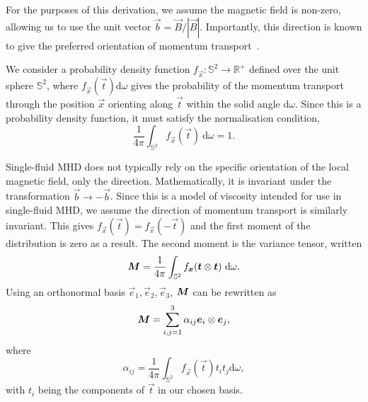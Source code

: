 For the purposes of this derivation, we assume the magnetic field is non-zero, allowing us to use the unit vector $\vec{b} = \vec{B}/|\vec{B}|$. Importantly, this direction is known to give the preferred orientation of momentum transport~\cite{braginskiiTransportProcessesPlasma1965}.

We consider a probability density function $f_{\vec{x}} : \mathbb{S}^2 \to \mathbb{R}^+$ defined over the unit sphere $\mathbb{S}^2$, where $f_\vec{x}(\vec{t}) \text{d}\omega$ gives the probability of the momentum transport through the position $\vec{x}$ orienting along $\vec{t}$ within the solid angle d$\omega$. Since this is a probability density function, it must satisfy the normalisation condition,
\begin{equation}
  \label{eq:normalisation_condition}
  \frac{1}{4\pi} \int_{\mathbb{S}^2} f_\vec{x}(\vec{t})\ \text{d}\omega = 1.
\end{equation}

Single-fluid MHD does not typically rely on the specific orientation of the local magnetic field, only the direction. Mathematically, it is invariant under the transformation $\vec{b} \to -\vec{b}$. Since this is a model of viscosity intended for use in single-fluid MHD, we assume the direction of momentum transport is similarly invariant. This gives $f_\vec{x}(\vec{t}) = f_\vec{x}(-\vec{t})$ and the first moment of the distribution is zero as a result. The second moment is the variance tensor, written
\begin{equation}
  \label{eq:variance_tensor}
{\bm M} = \frac{1}{4\pi} \int_{\mathbb{S}^2} f_{\bm x}({\bm t} \otimes {\bm t}) \ \text{d}\omega.
\end{equation}
Using an orthonormal basis ${\vec{e}_1, \vec{e}_2, \vec{e}_3}$, ${\bm M}$ can be rewritten as
\begin{equation}
  \label{eq:variance_tensor_basis}
  {\bm M} = \sum_{i,j=1}^{3} \alpha_{ij} {\bm e}_i \otimes {\bm e}_j,
\end{equation}
where
\begin{equation}
  \label{eq:variance_components}
\alpha_{ij} = \frac{1}{4\pi} \int_{\mathbb{S}^2} f_\vec{x}(\vec{t}) t_i t_j \text{d}\omega,
\end{equation}
with $t_i$ being the components of $\vec{t}$ in our chosen basis.

